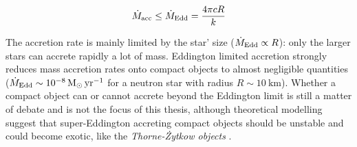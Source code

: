 \documentclass[a4paper,titlepage]{book}     	%
\newcommand{\sun}{\ensuremath{_\odot}}
\newcommand{\mdot}{\ensuremath{\dot{M}}}
\newcommand{\yr}{\text{yr}}
\begin{document}
\begin{equation}\label{eq:Eddingtonaccretion}
\mdot_{\rm acc} \leq \dot{M}_\textup{Edd} = \frac{4 \pi c R}{k}
\end{equation}

The accretion rate is mainly limited by the star' size ($\dot{M}_\textup{Edd} \propto R$): only the larger stars can accrete rapidly a lot of mass. Eddington limited accretion strongly reduces mass accretion rates onto compact objects to almost negligible quantities ($\dot{M}_\textup{Edd} \sim\SI{e-8}{M\sun~\yr^{-1}}$ for a neutron star with radius $R\sim\SI{10}{\kilo\metre}$). Whether a compact object can or cannot accrete beyond the Eddington limit is still a matter of debate and is not the focus of this thesis, although theoretical modelling suggest that super-Eddington accreting compact objects should be unstable and could become exotic, like the \emph{Thorne-{\.Z}ytkow objects} \cite{binaries}.
\end{document}
